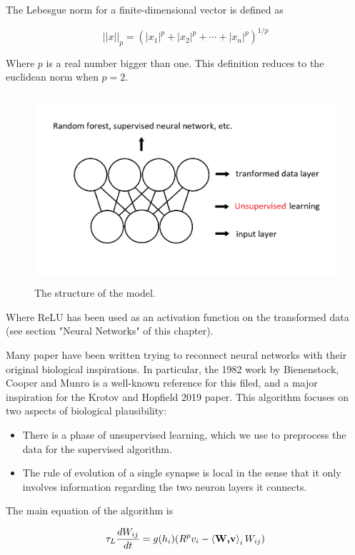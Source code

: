 \documentclass[a4paper]{report}
\begin{document}
The Lebesgue norm for a finite-dimensional vector is defined as

\begin{equation}
	||x||_p = (|x_1|^p+|x_2|^p+\cdots +|x_n|^p)^{1/p}
\end{equation}

Where $p$ is a real number bigger than one.
This definition reduces to the euclidean norm when $p=2$.

\begin{figure} [H]
\centering
\includegraphics [height=7cm ,width=12cm ] {o/2parti2.png}
\caption{The structure of the model.}
\end{figure}

Where ReLU has been used as an activation function on the transformed data (see section "Neural Networks" of this chapter).

Many paper have been written trying to reconnect neural networks with their original biological inspirations. In particular, the 1982 work by Bienenstock, Cooper and Munro is a well-known reference for this filed, and a major inspiration for the Krotov and Hopfield 2019 paper. This algorithm focuses on two aspects of biological plausibility:
\begin{itemize}
	\item There is a phase of unsupervised learning, which we use to preprocess the data for the supervised algorithm.
	\item The rule of evolution of a single synapse is local in the sense that it only involves information regarding the two neuron layers it connects.
\end{itemize}

The main equation of the algorithm is

\begin{equation}
    \tau_L \frac{dW_{ij}}{dt} = g(h_i)(R^p v_i - \braket{\textbf{W,v}}_i W_{ij} )
    \label{main}
\end{equation}
\end{document}
